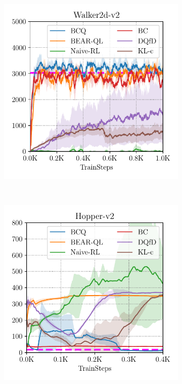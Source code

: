 \begin{figure}[t!]
\begin{subfigure}[t]{0.23\textwidth}
        \includegraphics[width=0.99\linewidth]{chapters/bear/images/images_camera_ready/walker_optimal_camera_ready.pdf}
    \end{subfigure}
    ~
    \begin{subfigure}[t]{0.23\textwidth}
        \centering
        \includegraphics[width=0.99\linewidth]{chapters/bear/images/images_camera_ready/hopper_random_camera_ready.pdf}

\end{subfigure}
\end{figure}
